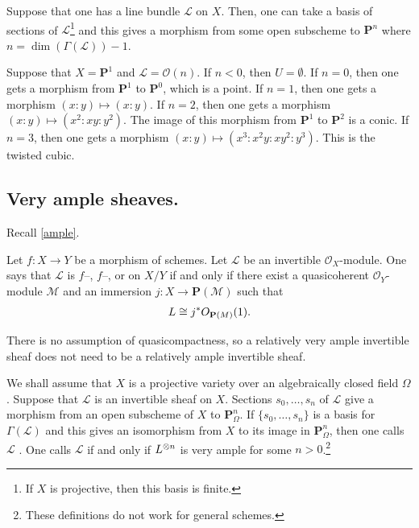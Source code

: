\documentclass [11 pt, oneside] {article}
\begin{document}
Suppose that one has a line bundle $\mathscr{L}$ on $X$. Then, one can take a basis of sections of $\mathscr{L}$\footnote{If $X$ is projective, then this basis is finite.} and this gives a morphism from some open subscheme to $\mathbf{P}^n$ where $n=\dim(\Gamma(\mathscr{L}))-1$.  

\begin{example}[ ]\label{usefulnow}\text{}
Suppose that $X=\mathbf{P}^1$ and $\mathscr{L}=\mathscr{O}(n)$. If $n<0$, then $U =\emptyset$. If $n=0$, then one gets a morphism from $\mathbf{P}^1$ to $\mathbf{P}^0$, which is a point. 
If $n=1$, then one gets a morphism $(x:y)\longmapsto  (x:y)$.
If $n=2$, then one gets a morphism $(x:y)\longmapsto  (x^2:xy:y^2)$. The image of this morphism from $\mathbf{P}^1$ to $\mathbf{P}^2$ is a conic.
If $n=3$, then one gets a morphism $(x:y)\longmapsto  (x^3:x^2y:xy^2:y^3)$. This is the twisted cubic.
\end{example}

\subsection{Very ample sheaves.}
Recall \cref{ample}.

\begin{example}\label{}\text{}
Let $f:X\longrightarrow Y$ be a morphism of schemes. Let $\mathscr{L}$ be an invertible $\mathscr{O}_X$-module. One says that $\mathscr{L}$ is $f$--, $f$--, or  on $X/Y$ if and only if there exist a quasicoherent $\mathscr{O}_Y$-module $\mathscr{M}$ and an immersion $j:X\longrightarrow \mathbf{P}(\mathscr{M})$ such that 
\begin{align*}
	\relax{L}\cong j^*\relax{O}_{\mathbf{P}(\relax{M}) } (1).	
\end{align*}
\end{example}

\begin{remark}
	There is no assumption of quasicompactness, so a relatively very ample invertible sheaf does not need to be a relatively ample invertible sheaf.
\end{remark}

We shall assume that $X$ is a projective variety over an algebraically closed field $\Omega$. Suppose that $\mathscr{L}$ is an invertible sheaf on $X$. Sections $s_0,\hdots, s_n$ of $\mathscr{L}$ give a morphism from an open subscheme of $X$ to $\mathbf{P}^n_\Omega$.
If $\{s_0,\hdots,s_n\}$ is a basis for $\Gamma(\mathscr{L})$ and this gives an isomorphism from $X$ to its image in $\mathbf{P}^n_\Omega$, then one calls $\mathscr{L}$ . One calls $\mathscr{L}$  if and only if $\relax{L}^{\otimes n}$ is very ample for some $n>0$.\footnote{These definitions do not work for general schemes.}
\end{document}
